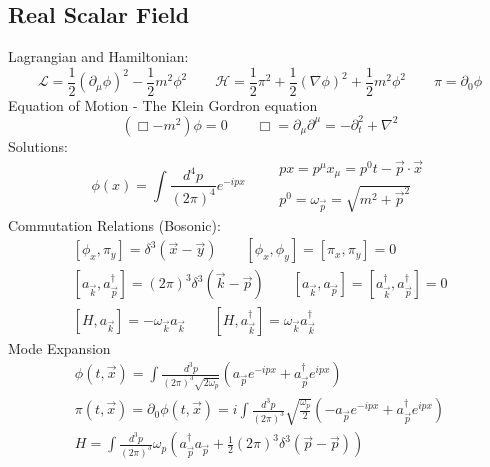\documentclass{article}
\begin{document}
\subsection{Real Scalar Field}
Lagrangian and Hamiltonian:
\begin{equation*}
    \mathcal{L} = \frac{1}{2}\left(\partial_\mu\phi\right)^2 - \frac{1}{2}m^2\phi^2
    \qquad
    \mathcal{H} = \frac{1}{2} \pi^2 + \frac{1}{2}\left(\nabla \phi\right)^2 + \frac{1}{2}m^2\phi^2
    \qquad
    \pi = \partial_0 \phi
\end{equation*}
Equation of Motion - The Klein Gordron equation
\begin{equation*}
    \left(\Box - m^2\right)\phi = 0
    \qquad
    \Box = \partial_\mu \partial^\mu = - \partial_t^2 + \nabla^2
\end{equation*}
Solutions:
\begin{equation*}
    \phi(x) = \int \frac{d^4p}{(2\pi)^4}e^{-ipx}
    \qquad
    \begin{matrix}
        px = p^\mu x_\mu = p^0t - \vec{p}\cdot\vec{x}
        \\
        p^0 = \omega_{\vec{p}} = \sqrt{m^2 + \vec{p}^2}
    \end{matrix}
\end{equation*}
Commutation Relations (Bosonic):
\begin{equation*}
\begin{gathered}
    \left[\phi_x, \pi_y\right] = \delta^3(\vec{x} - \vec{y})
    \qquad
    \left[\phi_x, \phi_y\right] =
    \left[\pi_x, \pi_y\right] = 0
    \\
    \left[a_{\vec{k}}, a^\dagger_{\vec{p}}\right] = \left(2\pi\right)^3\delta^3(\vec{k} - \vec{p})
    \qquad
    \left[a_{\vec{k}}, a_{\vec{p}}\right] =
    \left[a^\dagger_{\vec{k}}, a^\dagger_{\vec{p}}\right] = 0
    \\
    \left[H, a_{\vec{k}}\right] = -\omega_{\vec{k}}a_{\vec{k}}
    \qquad
    \left[H, a^\dagger_{\vec{k}}\right] = \omega_{\vec{k}}a^\dagger_{\vec{k}}
\end{gathered}
\end{equation*}
Mode Expansion
\begin{equation*}
\begin{gathered}
    \phi(t, \vec{x}) = \int \frac{d^3p}{(2\pi)^3\sqrt{2\omega_p}}\left(
        a_{\vec{p}}e^{-ipx} + a^\dagger_{\vec{p}}e^{ipx}
    \right)
    \\
    \pi(t, \vec{x}) = \partial_0 \phi(t, \vec{x}) = i\int \frac{d^3p}{(2\pi)^3}\sqrt{\frac{\omega_p}{2}}\left(
        -a_{\vec{p}}e^{-ipx} + a^\dagger_{\vec{p}}e^{ipx}
    \right)
    \\
    H = \int \frac{d^3p}{(2\pi)^3}\omega_p\left(
        a^\dagger_{\vec{p}}a_{\vec{p}}
        + \frac{1}{2} \left(2\pi\right)^3 \delta^3(\vec{p} - \vec{p})
    \right)
\end{gathered}
\end{equation*}
\end{document}
